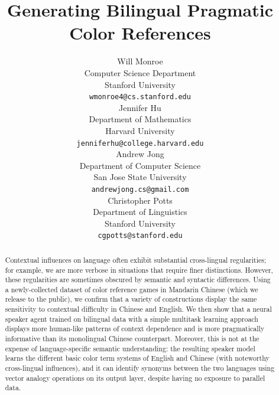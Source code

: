 \documentclass[11pt,a4paper]{article}
\title{Generating Bilingual Pragmatic Color References}
\author{Will Monroe \\
  Computer Science Department \\
  Stanford University \\
  {\tt wmonroe4@cs.stanford.edu} \\\And
  Jennifer Hu \\
  Department of Mathematics \\
  Harvard University \\
  {\tt jenniferhu@college.harvard.edu} \\\AND 
  Andrew Jong \\
  Department of Computer Science \\
  San Jose State University \\
  {\tt andrewjong.cs@gmail.com} \\\And
  Christopher Potts \\
  Department of Linguistics \\
  Stanford University \\
  {\tt cgpotts@stanford.edu} \\}
\date{}
\renewcommand{\|}{\mid}
\begin{document}
\maketitle
\begin{abstract}
 Contextual influences on language often exhibit substantial cross-lingual
 regularities; for example, we are more verbose in situations that require finer
 distinctions. However, these regularities are sometimes obscured by semantic
 and syntactic differences. Using a newly-collected dataset of color reference games in Mandarin
 Chinese (which we release to the public), we confirm that a variety of constructions
 display the same sensitivity to contextual difficulty in Chinese and English. We
 then show that a neural speaker agent trained on bilingual data with a simple
 multitask learning approach displays more human-like patterns
 of context dependence and is more pragmatically informative than its monolingual
 Chinese counterpart. Moreover, this is not at the expense of language-specific
 semantic understanding: the resulting speaker model learns the different basic color
 term systems of English and Chinese (with noteworthy cross-lingual influences), and it
 can identify synonyms between the two languages using vector analogy operations on
 its output layer, despite having no exposure to parallel data.



\end{abstract}
\end{document}
